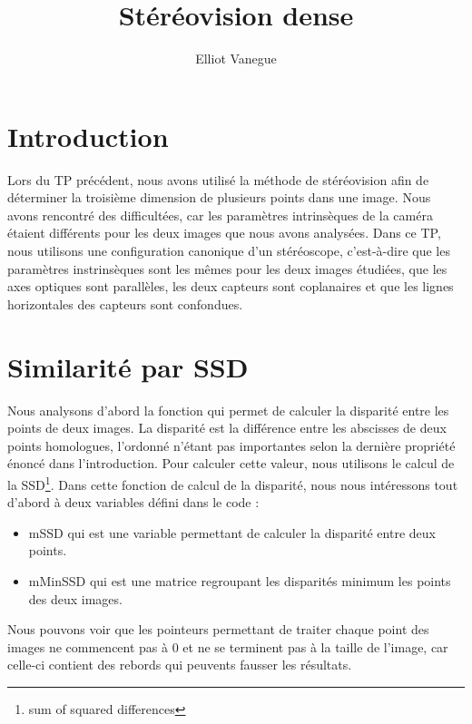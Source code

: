 \documentclass[a4paper,10pt]{article}
\title{Stéréovision dense}
\author{Elliot Vanegue}
\begin{document}
\maketitle

\section{Introduction}
Lors du TP précédent, nous avons utilisé la méthode de stéréovision afin de 
déterminer la troisième dimension de plusieurs points dans une image. Nous 
avons rencontré des difficultées, car les paramètres intrinsèques de la 
caméra étaient différents pour les deux images que nous avons analysées.
Dans ce TP, nous utilisons une configuration canonique d'un stéréoscope,
c'est-à-dire que les paramètres instrinsèques sont les mêmes pour les deux
images étudiées, que les axes optiques sont parallèles, les deux capteurs
sont coplanaires et que les lignes horizontales des capteurs sont confondues.

\section{Similarité par SSD}
Nous analysons d'abord la fonction qui permet de calculer la disparité entre 
les points de deux images. La disparité est la différence entre les abscisses de
deux points homologues, l'ordonné n'étant pas importantes selon la dernière propriété
énoncé dans l'introduction. Pour calculer cette valeur, nous utilisons le calcul de
la SSD\footnote{sum of squared differences}. Dans cette fonction de calcul de la disparité, 
nous nous intéressons tout d'abord à deux variables défini dans le code :
\begin{itemize}
 \item mSSD qui est une variable permettant de calculer la disparité entre deux points.
 \item mMinSSD qui est une matrice regroupant les disparités minimum les points des deux images.
\end{itemize}
Nous pouvons voir que les pointeurs permettant de traiter chaque point des images
ne commencent pas à 0 et ne se terminent pas à la taille de l'image, car celle-ci
contient des rebords qui peuvents fausser les résultats.\\
\end{document}
